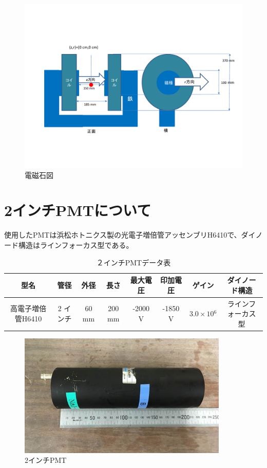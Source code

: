 \begin{figure}[H]
	\centering
		\includegraphics[width=15cm]{fig/iguchi/magnetfigure.pdf}
	\caption{電磁石図}
	\label{magnetfigure}
\end{figure}

\section{2インチPMTについて}
使用したPMTは浜松ホトニクス製の光電子増倍管アッセンブリH6410で、ダイノード構造はラインフォーカス型である。
\begin{table}[htb]
	\begin{center}
	
	  \begin{tabular}{|c|c|c|c|c|c|c|c|} \hline
		型名& 管径 & 外径 & 長さ & 最大電圧 & 印加電圧 & ゲイン & ダイノード構造 \\ \hline \hline
		高電子増倍管H6410 & 2 インチ & 60 mm & 200 mm & -2000 V & -1850 V & $3.0\times10{^{6}}$ &ラインフォーカス型 \\ \hline
	\end{tabular}
	  \caption{２インチPMTデータ表}
	\end{center}
\end{table}

\begin{figure}[H]
	\centering
		\includegraphics[width=10cm]{fig/iguchi/PMTphoto.jpg}
	\caption{2インチPMT}
	\label{PMTphoto}
\end{figure}


